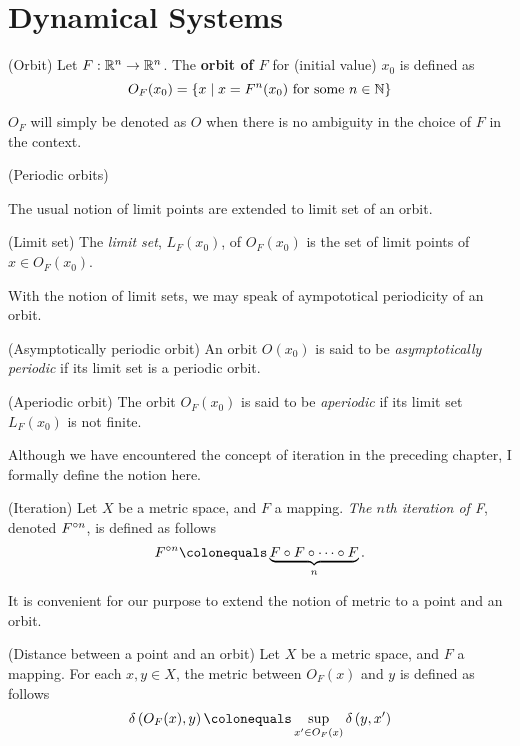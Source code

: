 \documentclass[12pt,twoside,draft]{book}
\begin{document}
\section{Dynamical Systems}

\begin{definition}
  (Orbit)
  Let $F: \mathbb{R}^n \to \mathbb{R}^n$. 
  The \textbf{orbit of $F$} for (initial value) $x_0$ is defined as
  \begin{equation*}
    O_F(x_0) = \left \{ x \mathrel{} \middle| \mathrel{} x = F^n(x_0) \mbox{ for some } n\in \mathbb{N} \right \}
  \end{equation*}
  \label{def:orbit}
\end{definition}
$O_F$ will simply be denoted as $O$ when there is no ambiguity in the choice of $F$ in the context.

\begin{definition}
  (Periodic orbits)
  \label{def:porbit}
\end{definition}

The usual notion of limit points are extended to limit set of an orbit.
\begin{definition}
  (Limit set)
  The \textit{limit set}, $L_F(x_0)$, of $O_F(x_0)$ is the set of limit points of $x \in O_F(x_0)$.
  \label{def:limset}
\end{definition}

With the notion of limit sets, we may speak of aympototical periodicity of an orbit.
\begin{definition}
  (Asymptotically periodic orbit)
  An orbit $O(x_0)$ is said to be \textit{asymptotically periodic} if its limit set is a periodic orbit.
  \label{def:asymporb}
\end{definition}

\begin{definition}
  (Aperiodic orbit)
  The orbit $O_F(x_0)$ is said to be \textit{aperiodic} if its limit set $L_F(x_0)$ is not finite.
  \label{def:aporbit}
\end{definition}

Although we have encountered the concept of iteration in the preceding chapter, I formally define the notion here.
\begin{definition}
  (Iteration)
  Let $X$ be a metric space, and $F$ a mapping.
  \textit{The $n$th iteration of F}, denoted $F^{\circ n}$, is defined as follows
  \begin{equation*}
    \itr{F}{n} \ceq \underbrace{F \circ F \circ \cdots \circ F}_{n} .
  \end{equation*}
\end{definition}
%
It is convenient for our purpose to extend the notion of metric to a point and an orbit.
\begin{definition}
  (Distance between a point and an orbit)
  Let $X$ be a metric space, and $F$ a mapping.
  For each $x,y \in X$, the metric between $O_F(x)$ and $y$ is defined as follows
  \begin{equation*}
    \metric{O_F(x),y} \ceq \sup\limits_{x' \in O_F(x)} \metric{y,x'}
  \end{equation*}
\end{definition}
\end{document}
